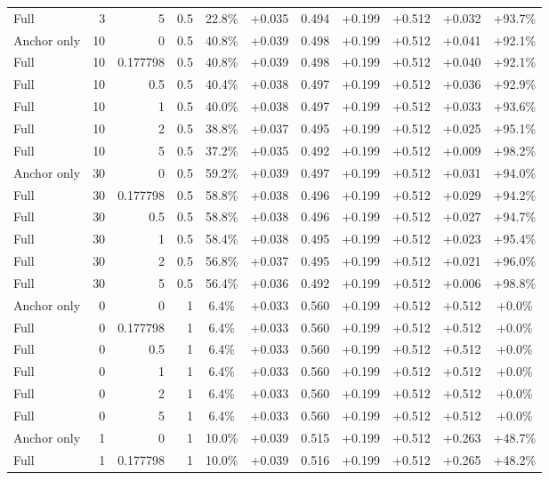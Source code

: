 \begin{table}[htbp]
\begin{tabular}{lrrrccccccc}
Full & 3 & 5 & 0.5 & 22.8\% & +0.035 & 0.494 & +0.199 & +0.512 & +0.032 & +93.7\% \\
Anchor only & 10 & 0 & 0.5 & 40.8\% & +0.039 & 0.498 & +0.199 & +0.512 & +0.041 & +92.1\% \\
Full & 10 & 0.177798 & 0.5 & 40.8\% & +0.039 & 0.498 & +0.199 & +0.512 & +0.040 & +92.1\% \\
Full & 10 & 0.5 & 0.5 & 40.4\% & +0.038 & 0.497 & +0.199 & +0.512 & +0.036 & +92.9\% \\
Full & 10 & 1 & 0.5 & 40.0\% & +0.038 & 0.497 & +0.199 & +0.512 & +0.033 & +93.6\% \\
Full & 10 & 2 & 0.5 & 38.8\% & +0.037 & 0.495 & +0.199 & +0.512 & +0.025 & +95.1\% \\
Full & 10 & 5 & 0.5 & 37.2\% & +0.035 & 0.492 & +0.199 & +0.512 & +0.009 & +98.2\% \\
Anchor only & 30 & 0 & 0.5 & 59.2\% & +0.039 & 0.497 & +0.199 & +0.512 & +0.031 & +94.0\% \\
Full & 30 & 0.177798 & 0.5 & 58.8\% & +0.038 & 0.496 & +0.199 & +0.512 & +0.029 & +94.2\% \\
Full & 30 & 0.5 & 0.5 & 58.8\% & +0.038 & 0.496 & +0.199 & +0.512 & +0.027 & +94.7\% \\
Full & 30 & 1 & 0.5 & 58.4\% & +0.038 & 0.495 & +0.199 & +0.512 & +0.023 & +95.4\% \\
Full & 30 & 2 & 0.5 & 56.8\% & +0.037 & 0.495 & +0.199 & +0.512 & +0.021 & +96.0\% \\
Full & 30 & 5 & 0.5 & 56.4\% & +0.036 & 0.492 & +0.199 & +0.512 & +0.006 & +98.8\% \\
Anchor only & 0 & 0 & 1 & 6.4\% & +0.033 & 0.560 & +0.199 & +0.512 & +0.512 & +0.0\% \\
Full & 0 & 0.177798 & 1 & 6.4\% & +0.033 & 0.560 & +0.199 & +0.512 & +0.512 & +0.0\% \\
Full & 0 & 0.5 & 1 & 6.4\% & +0.033 & 0.560 & +0.199 & +0.512 & +0.512 & +0.0\% \\
Full & 0 & 1 & 1 & 6.4\% & +0.033 & 0.560 & +0.199 & +0.512 & +0.512 & +0.0\% \\
Full & 0 & 2 & 1 & 6.4\% & +0.033 & 0.560 & +0.199 & +0.512 & +0.512 & +0.0\% \\
Full & 0 & 5 & 1 & 6.4\% & +0.033 & 0.560 & +0.199 & +0.512 & +0.512 & +0.0\% \\
Anchor only & 1 & 0 & 1 & 10.0\% & +0.039 & 0.515 & +0.199 & +0.512 & +0.263 & +48.7\% \\
Full & 1 & 0.177798 & 1 & 10.0\% & +0.039 & 0.516 & +0.199 & +0.512 & +0.265 & +48.2\% \\

\end{tabular}
\end{table}
